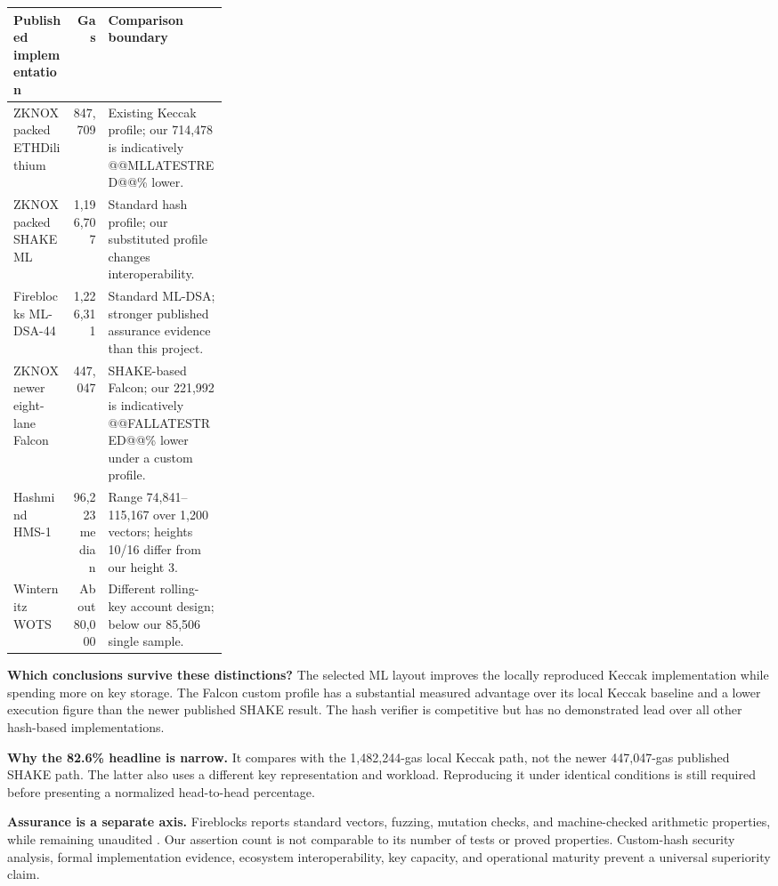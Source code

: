 \documentclass[11pt,a4paper]{article}
\begin{document}
\begin{tabularx}{\linewidth}{P{0.28\linewidth}rY}
\toprule
\textbf{Published implementation} & \textbf{Gas} & \textbf{Comparison boundary}\\
\midrule
ZKNOX packed ETHDilithium \cite{ethdil} & 847,709 & Existing Keccak profile; our 714,478 is indicatively @@MLLATESTRED@@\% lower.\\
ZKNOX packed SHAKE ML \cite{ethdil} & 1,196,707 & Standard hash profile; our substituted profile changes interoperability.\\
Fireblocks ML-DSA-44 \cite{fireblocks} & 1,226,311 & Standard ML-DSA; stronger published assurance evidence than this project.\\
ZKNOX newer eight-lane Falcon \cite{ethfalcon} & 447,047 & SHAKE-based Falcon; our 221,992 is indicatively @@FALLATESTRED@@\% lower under a custom profile.\\
Hashmind HMS-1 \cite{hashmind} & 96,223 median & Range 74,841--115,167 over 1,200 vectors; heights 10/16 differ from our height 3.\\
Winternitz WOTS \cite{winternitz} & About 80,000 & Different rolling-key account design; below our 85,506 single sample.\\
\bottomrule
\end{tabularx}

\textbf{Which conclusions survive these distinctions?} The selected ML
layout improves the locally reproduced Keccak implementation while spending
more on key storage. The Falcon custom profile has a substantial measured
advantage over its local Keccak baseline and a lower execution figure than
the newer published SHAKE result. The hash verifier is competitive but has
no demonstrated lead over all other hash-based implementations.

\textbf{Why the 82.6\% headline is narrow.} It compares with the 1,482,244-gas
local Keccak path, not the newer 447,047-gas published SHAKE path. The latter
also uses a different key representation and workload. Reproducing it under
identical conditions is still required before presenting a normalized
head-to-head percentage.

\textbf{Assurance is a separate axis.} Fireblocks reports standard vectors,
fuzzing, mutation checks, and machine-checked arithmetic properties, while
remaining unaudited \cite{fireblocks}. Our assertion count is not comparable
to its number of tests or proved properties. Custom-hash security analysis,
formal implementation evidence, ecosystem interoperability, key capacity,
and operational maturity prevent a universal superiority claim.
\end{document}
